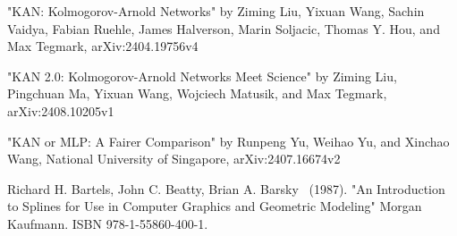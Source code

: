\begin{thebibliography}{999}

{"KAN: Kolmogorov-Arnold Networks"} by Ziming Liu, Yixuan Wang, Sachin Vaidya, Fabian Ruehle, James Halverson, Marin Soljacic, Thomas Y. Hou, and Max Tegmark, arXiv:2404.19756v4


{"KAN 2.0: Kolmogorov-Arnold Networks Meet Science"} by Ziming Liu, Pingchuan Ma, Yixuan Wang, Wojciech Matusik, and Max Tegmark, arXiv:2408.10205v1

{"KAN or MLP: A Fairer Comparison"} by Runpeng Yu, Weihao Yu, and Xinchao Wang, National University of Singapore, arXiv:2407.16674v2

Richard H. Bartels, John C. Beatty, Brian A. Barsky ~(1987). {"An Introduction to Splines for Use in Computer Graphics and Geometric Modeling"} Morgan Kaufmann. ISBN 978-1-55860-400-1.

\end{thebibliography}